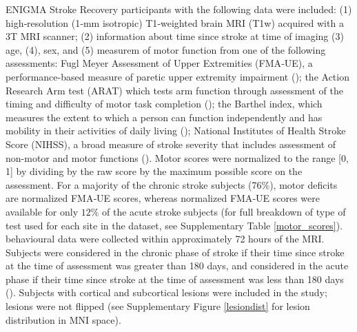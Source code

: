 \documentclass[phd,tocprelim]{cornell}
\begin{document}
ENIGMA Stroke Recovery participants with the following data were included: (1) high‐resolution (1‐mm isotropic) T1‐weighted brain MRI (T1w) acquired with a 3T MRI scanner; (2) information about time since stroke at time of imaging (3) age, (4), sex, and (5) measurem of motor function from one of the following assessments: Fugl Meyer Assessment of Upper Extremities (FMA‐UE), a performance-based measure of paretic upper extremity impairment (\cite{Gladstone2002-fw}); the Action Research Arm test (ARAT) which tests arm function through assessment of the timing and difficulty of motor task completion (\cite{Yozbatiran2008-xv}); the Barthel index, which measures the extent to which a person can function independently and has mobility in their activities of daily living (\cite{Sulter1999-rr}); National Institutes of Health Stroke Score (NIHSS), a broad measure of stroke severity that includes assessment of non-motor and motor functions (\cite{Lyden2017-za}). Motor scores were normalized to the range [0, 1] by dividing by the raw score by the maximum possible score on the assessment. For a majority of the chronic stroke subjects (76$\%$), motor deficits are normalized FMA‐UE scores, whereas  normalized FMA‐UE scores were available for only $12\%$ of the acute stroke subjects (for full breakdown of type of test used for each site in the dataset, see Supplementary Table \ref{motor_scores}). behavioural data were collected within approximately 72 hours of the MRI. Subjects were considered in the chronic phase of stroke if their time since stroke at the time of assessment was greater than 180 days, and considered in the acute phase if their time since stroke at the time of assessment was less than 180 days (\cite{Bernhardt2017-av}). Subjects with cortical and subcortical lesions were included in the study; lesions were not flipped (see Supplementary Figure \ref{lesiondist} for lesion distribution in MNI space). 
\end{document}
